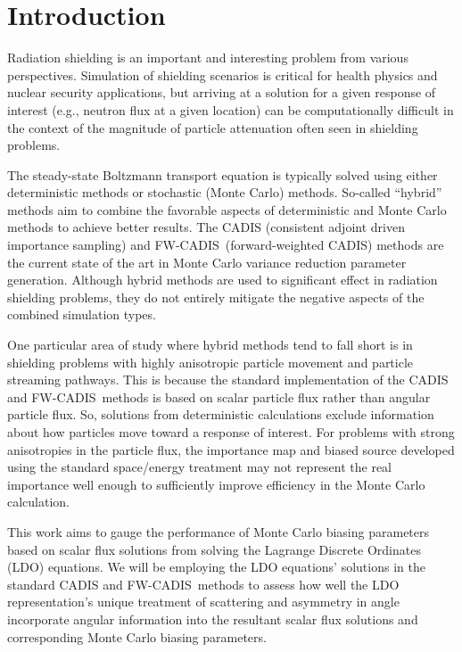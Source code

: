 \documentclass{article} %
\newcommand{\fwc}{\mbox{FW-CADIS}}
\begin{document}
\pagebreak

\begin{abstract}
{
abstract

Keywords: x; y; z
}
\end{abstract}

\pagebreak


\section{Introduction}
\label{sec:intro}

Radiation shielding is an important and interesting problem from various
perspectives. Simulation of shielding scenarios is critical for health physics
and nuclear security applications, but arriving at a solution for a given
response of interest (e.g., neutron flux at a given location) can be
computationally difficult in the context of
the magnitude of particle attenuation often seen in shielding problems.

The steady-state Boltzmann transport equation is typically solved using either 
deterministic methods or stochastic (Monte Carlo) methods. So-called ``hybrid''
methods aim to combine the favorable aspects of deterministic and Monte Carlo
methods to achieve better results. The CADIS (consistent adjoint driven
importance sampling) and \fwc\ (forward-weighted CADIS) methods are the current
state of the art in Monte Carlo variance reduction parameter generation.
Although hybrid methods are used to
significant effect in radiation shielding problems, they do not entirely
mitigate the negative aspects of the combined simulation types.

One particular area of study where hybrid methods tend to fall short is in
shielding problems with highly anisotropic particle movement and particle
streaming pathways. This is because the standard implementation of the CADIS
and \fwc\ methods is based on scalar particle flux rather than angular particle
flux. So, solutions from deterministic calculations exclude information about
how particles move toward a response of interest. For problems with strong
anisotropies in the particle flux, the importance map and biased source 
developed using the standard space/energy treatment may not represent the real
importance well enough to sufficiently improve efficiency in the Monte Carlo
calculation. 

This work aims to gauge the performance of Monte Carlo biasing parameters based
on scalar flux solutions from solving the Lagrange Discrete Ordinates (LDO)
equations. We will be employing the LDO equations' solutions in the standard
CADIS and \fwc\ methods to assess how well the LDO representation's unique
treatment of scattering and asymmetry in angle incorporate angular information
into the resultant scalar flux solutions and corresponding Monte Carlo biasing
parameters.
\end{document}

